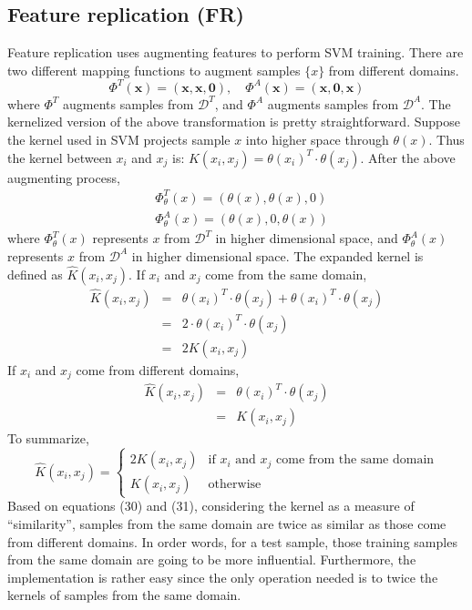 \subsection{Feature replication (FR)}
Feature replication \cite{daume2007frustratingly} uses augmenting features to perform SVM training. There are two different mapping functions to augment samples $\{x\}$ from different domains. 
\begin{equation}
\Phi^T(\mathbf{x}) = (\mathbf{x},\mathbf{x},\mathbf{0}), \quad  \Phi^A(\mathbf{x}) = (\mathbf{x},\mathbf{0}, \mathbf{x})
\end{equation}
where $\Phi^T$ augments samples from $\mathcal{D}^T$, and $\Phi^A$ augments samples from $\mathcal{D}^A$. The kernelized version of the above transformation is pretty straightforward. Suppose the kernel used in SVM projects sample $x$ into higher space through $\theta(x)$. Thus the kernel between $x_i$ and $x_j$ is: $K(x_i, x_j) = \theta(x_i)^T \cdot \theta(x_j)$. After the above augmenting process, 
\begin{eqnarray}
& \Phi_{\theta}^T(x) = (\theta(x), \theta(x), 0) \nonumber \\
& \Phi_{\theta}^A(x) = (\theta(x), 0, \theta(x)) 
\end{eqnarray}
where $\Phi_{\theta}^T(x)$ represents $x$ from $\mathcal{D}^T$ in higher dimensional space, and $\Phi_{\theta}^A(x)$ represents $x$ from $\mathcal{D}^A$ in higher dimensional space. The expanded kernel is defined as $\hat K(x_i, x_j)$. If $x_i$ and $x_j$ come from the same domain, 
\begin{eqnarray}
\hat K(x_i, x_j) &  = & \theta(x_i)^T \cdot \theta(x_j) + \theta(x_i)^T \cdot \theta(x_j) \nonumber \\
 & = & 2 \cdot \theta(x_i)^T \cdot \theta(x_j)   \nonumber \\
 & = & 2 K(x_i, x_j)
\end{eqnarray}
\noindent If  $x_i$ and $x_j$ come from different domains,
\begin{eqnarray}
\hat K(x_i, x_j)  & = &  \theta(x_i)^T \cdot \theta(x_j)  \nonumber \\
 & = &  K(x_i, x_j) 
\end{eqnarray}
\noindent To summarize,  
\[
 \hat K(x_i, x_j) =
  \begin{cases}
   2 K(x_i, x_j) & \text{if } x_i \text{ and } x_j \text{ come from the same domain}\\
   K(x_i, x_j)   & \text{otherwise} 
  \end{cases}
\]
\noindent Based on equations (30) and (31), considering the kernel as a measure of ``similarity'', samples from the same domain are twice as similar as those come from different domains. In order words, for a test sample, those training samples from the same domain  are going to be more influential. Furthermore, the implementation is rather easy since the only operation needed is to twice the kernels of samples from the same domain. 

